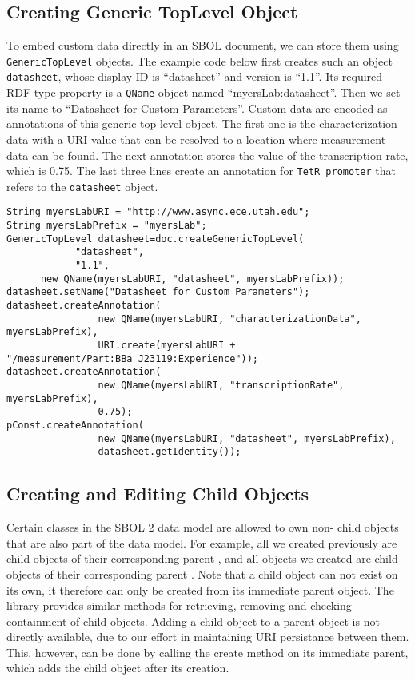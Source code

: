 \subsection*{Creating Generic TopLevel Object}
To embed custom data directly in an SBOL document, we can store them
using \lstinline+GenericTopLevel+ objects. The example code below first
creates such an object \lstinline+datasheet+, whose display ID is
``datasheet'' and version is ``1.1''. Its required RDF type property
is a \lstinline+QName+ object named
``myersLab:datasheet''. Then we set its name to
``Datasheet for Custom Parameters''. Custom data are encoded as annotations of this generic
top-level object. The first one is the characterization data with a
URI value that can be resolved to a location where measurement data
can be found. The next annotation stores the value of the
transcription rate, which is 0.75. The last three lines create
an annotation for \lstinline+TetR_promoter+ that refers to the
\lstinline+datasheet+ object.

\vspace{\abovedisplayskip}
\begin{minipage}{0.95\textwidth} 
\begin{lstlisting}
String myersLabURI = "http://www.async.ece.utah.edu";
String myersLabPrefix = "myersLab";	
GenericTopLevel datasheet=doc.createGenericTopLevel(
			"datasheet",
			"1.1",
      new QName(myersLabURI, "datasheet", myersLabPrefix));
datasheet.setName("Datasheet for Custom Parameters");		
datasheet.createAnnotation(
				new QName(myersLabURI, "characterizationData", myersLabPrefix), 
				URI.create(myersLabURI + "/measurement/Part:BBa_J23119:Experience"));				
datasheet.createAnnotation(
				new QName(myersLabURI, "transcriptionRate", myersLabPrefix), 
				0.75);
pConst.createAnnotation(
				new QName(myersLabURI, "datasheet", myersLabPrefix), 
				datasheet.getIdentity());
\end{lstlisting}
\end{minipage}

\subsection*{Creating and Editing Child Objects}
Certain classes in the SBOL 2 data model are allowed to own non- child
objects that are also part of the data model. For example, all
 we created previously are child objects of
their corresponding parent , and all
 objects we created are child objects of their corresponding
parent . Note that a child object can not exist on its
own, it therefore can only be created from its immediate parent
object. The library provides similar methods for retrieving,
removing and checking containment of child objects. Adding a child object to a parent
object is not directly available, due to our effort in maintaining
URI persistance between them. This, however, can be done by calling
the create method on its immediate parent, which adds the child object after its creation. 

